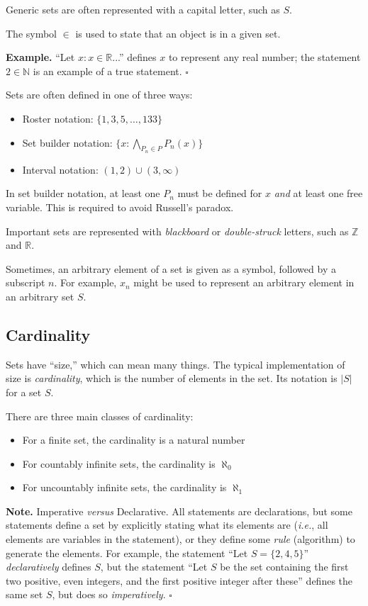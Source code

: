 \documentclass[letterpaper,twoside]{article}
\def\SmallHSpace{\hspace*{1mm}}
\newcommand\Ie[1]{\textit{i.e.}, #1}
\newcommand{\Note}[1]{%
    \emoji{warning} \textbf{Note.}\SmallHSpace #1 \hfill $\square$
}
\newcommand{\Example}[1]{%
    \emoji{magnifying-glass-tilted-right} \textbf{Example.}\SmallHSpace #1 \hfill $\square$
}
\newenvironment{SorrellItemize}
{
    \setlength\parskip{-5pt}
    \begin{itemize}[leftmargin=11pt]
        \setlength\itemsep{-4pt}
}{
    \end{itemize}
}
\begin{document}
\begin{multicols}{2}
Generic sets are often represented with a capital letter, such as $S$.

The symbol $\in$ is used to state that an object is in a given set.

\Example
{
    ``Let $x : x \in \mathbb{R}$...'' defines $x$ to represent any real number; the statement $2 \in \mathbb{N}$ is an example of a true statement.
}

Sets are often defined in one of three ways:
\begin{SorrellItemize}
    \item Roster notation: $\{1, 3, 5, \ldots, 133\}$
    \item Set builder notation: $\{ x : \bigwedge\limits_{P_n \in P} P_n(x) \}$
    \item Interval notation: $(1, 2) \cup (3, \infty)$
\end{SorrellItemize}

In set builder notation, at least one $P_n$ must be defined for $x$ \textit{and} at least one free variable.
This is required to avoid Russell's paradox.

Important sets are represented with \textit{blackboard} or \textit{double-struck} letters, such as $\mathbb{Z}$ and $\mathbb{R}$.

Sometimes, an arbitrary element of a set is given as a symbol, followed by a subscript $n$.
For example, $x_n$ might be used to represent an arbitrary element in an arbitrary set $S$.

\subsection{Cardinality}

Sets have ``size,'' which can mean many things.
The typical implementation of size is \textit{cardinality}, which is the number of elements in the set.
Its notation is $|S|$ for a set $S$.

There are three main classes of cardinality:
\begin{SorrellItemize}
    \item For a finite set, the cardinality is a natural number
    \item For countably infinite sets, the cardinality is $\aleph_0$
    \item For uncountably infinite sets, the cardinality is $\aleph_1$
\end{SorrellItemize}

\Note
{
    Imperative \textit{versus} Declarative.
    All statements are declarations, but some statements define a set by explicitly stating what its elements are (\Ie{all elements are variables in the statement}), or they define some \textit{rule} (algorithm) to generate the elements.
    For example, the statement ``Let $S = \{2, 4, 5\}$'' \textit{declaratively} defines $S$, but the statement ``Let $S$ be the set containing the first two positive, even integers, and the first positive integer after these'' defines the same set $S$, but does so \textit{imperatively}.
}


\end{multicols}
\end{document}
